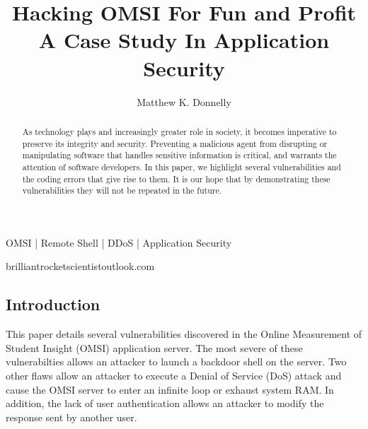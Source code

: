  

\title{%
  Hacking OMSI For Fun and Profit \\
  \large A Case Study In Application Security}


\author{Matthew K. Donnelly}

\maketitle

\begin{abstract}
As technology plays and increasingly greater role in society, it becomes imperative to preserve its integrity and security.  Preventing a malicious agent from disrupting or manipulating software that handles sensitive information is critical, and warrants the attention of software developers.  In this paper, we highlight several vulnerabilities and the coding errors that give rise to them.  It is our hope that by demonstrating these vulnerabilities they will not be repeated in the future.

\end {abstract}

\begin{keywords}
    OMSI | Remote Shell | DDoS | Application Security
\end{keywords}

\begin{corrauthor}
    brilliantrocketscientist\at outlook.com
\end{corrauthor}



\subsection*{Introduction}

This paper details several vulnerabilities discovered in the Online Measurement of Student Insight (OMSI) application server.  The most severe of these vulnerabilties allows an attacker to launch a backdoor shell on the server.  Two other flaws allow an attacker to execute a Denial of Service (DoS) attack and cause the OMSI server to enter an infinite loop or exhaust system RAM.  In addition, the lack of user authentication allows an attacker to modify the response sent by another user.


